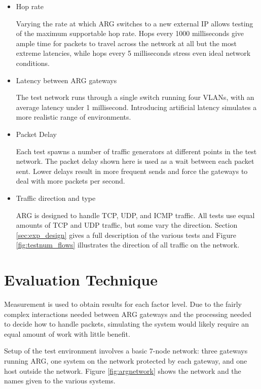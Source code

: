\begin{itemize}
\item Hop rate
	\par Varying the rate at which \ac{ARG} switches to a new external \ac{IP} allows testing of the maximum supportable hop rate. Hops every 1000 milliseconds give ample time for packets to travel across the network at all but the most extreme latencies, while hops every 5 milliseconds stress even ideal network conditions.

\item Latency between \ac{ARG} gateways
	\par The test network runs through a single switch running four \acp{VLAN}, with an average latency under 1 millisecond. Introducing artificial latency simulates a more realistic range of environments.

\item Packet Delay
	\par Each test spawns a number of traffic generators at different points in the test network. The packet delay shown here is used as a wait between each packet sent. Lower delays result in more frequent sends and force the gateways to deal with more packets per second.

\item Traffic direction and type
	\par \ac{ARG} is designed to handle \ac{TCP}, \ac{UDP}, and \ac{ICMP} traffic. All tests use equal amounts of \ac{TCP} and \ac{UDP} traffic, but some vary the direction. Section \ref{sec:exp_design} gives a full description of the various tests and Figure \ref{fig:testnum_flows} illustrates the direction of all traffic on the network.
\end{itemize}

\section{Evaluation Technique}
\label{sec:eval_technique}
\par Measurement is used to obtain results for each factor level. Due to the fairly complex interactions needed between \ac{ARG} gateways and the processing needed to decide how to handle packets, simulating the system would likely require an equal amount of work with little benefit.

\par Setup of the test environment involves a basic 7-node network: three gateways running \ac{ARG}, one system on the network protected by each gateway, and one host outside the network. Figure \ref{fig:argnetwork} shows the network and the names given to the various systems.

